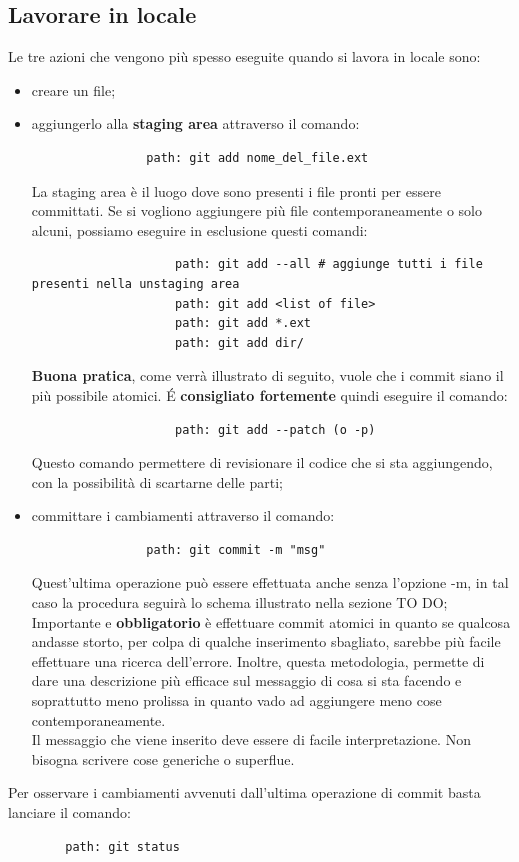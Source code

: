 	\subsection{Lavorare in locale} %
	\label{sub:lavorare_in_locale}
	Le tre azioni che vengono più spesso eseguite quando si lavora in locale sono:
		\begin{itemize}
			\item creare un file;
			\item aggiungerlo alla \textbf{staging area} attraverso il comando:
				\begin{verbatim}
				path: git add nome_del_file.ext
				\end{verbatim}
				\noindent
				La staging area è il luogo dove sono presenti i file pronti per essere committati.
				Se si vogliono aggiungere più file contemporaneamente o solo alcuni, possiamo eseguire in esclusione questi comandi:
					\begin{verbatim}
					path: git add --all # aggiunge tutti i file presenti nella unstaging area
					path: git add <list of file>
					path: git add *.ext
					path: git add dir/
					\end{verbatim}
				\noindent
				\textbf{Buona pratica}, come verrà illustrato di seguito, vuole che i commit siano il più possibile atomici. \'E \textbf{consigliato fortemente} quindi eseguire il comando:
					\begin{verbatim}
					path: git add --patch (o -p)
					\end{verbatim}
				\noindent
				Questo comando permettere di revisionare il codice che si sta aggiungendo, con la possibilità di scartarne delle parti;

			\item committare i cambiamenti attraverso il comando:
				\begin{verbatim}
				path: git commit -m "msg"
				\end{verbatim}
				\noindent
				Quest'ultima operazione può essere effettuata anche senza l'opzione -m, in tal caso la procedura seguirà lo schema illustrato nella sezione TO DO; \\
				Importante e \textbf{obbligatorio} è effettuare commit atomici in quanto se qualcosa andasse storto, per colpa di qualche inserimento sbagliato, sarebbe più facile effettuare una ricerca dell'errore. Inoltre, questa metodologia, permette di dare una descrizione più efficace sul messaggio di cosa si sta facendo e soprattutto meno prolissa in quanto vado ad aggiungere meno cose contemporaneamente. \\
				Il messaggio che viene inserito deve essere di facile interpretazione. Non bisogna scrivere cose generiche o superflue.
				 
		\end{itemize}
	\noindent
	Per osservare i cambiamenti avvenuti dall'ultima operazione di commit basta lanciare il comando:
		\begin{verbatim}
		path: git status
		\end{verbatim}

